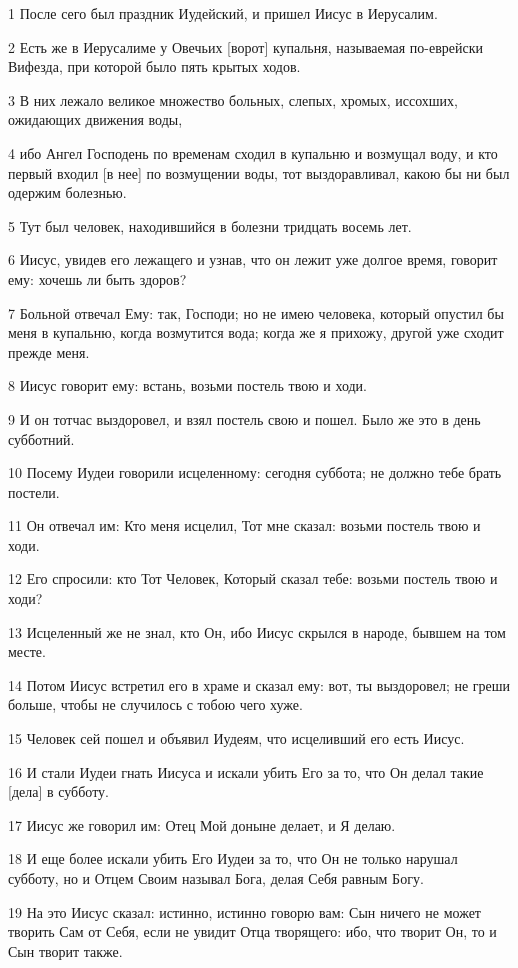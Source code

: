 \par 1 После сего был праздник Иудейский, и пришел Иисус в Иерусалим.
\par 2 Есть же в Иерусалиме у Овечьих [ворот] купальня, называемая по-еврейски Вифезда, при которой было пять крытых ходов.
\par 3 В них лежало великое множество больных, слепых, хромых, иссохших, ожидающих движения воды,
\par 4 ибо Ангел Господень по временам сходил в купальню и возмущал воду, и кто первый входил [в нее] по возмущении воды, тот выздоравливал, какою бы ни был одержим болезнью.
\par 5 Тут был человек, находившийся в болезни тридцать восемь лет.
\par 6 Иисус, увидев его лежащего и узнав, что он лежит уже долгое время, говорит ему: хочешь ли быть здоров?
\par 7 Больной отвечал Ему: так, Господи; но не имею человека, который опустил бы меня в купальню, когда возмутится вода; когда же я прихожу, другой уже сходит прежде меня.
\par 8 Иисус говорит ему: встань, возьми постель твою и ходи.
\par 9 И он тотчас выздоровел, и взял постель свою и пошел. Было же это в день субботний.
\par 10 Посему Иудеи говорили исцеленному: сегодня суббота; не должно тебе брать постели.
\par 11 Он отвечал им: Кто меня исцелил, Тот мне сказал: возьми постель твою и ходи.
\par 12 Его спросили: кто Тот Человек, Который сказал тебе: возьми постель твою и ходи?
\par 13 Исцеленный же не знал, кто Он, ибо Иисус скрылся в народе, бывшем на том месте.
\par 14 Потом Иисус встретил его в храме и сказал ему: вот, ты выздоровел; не греши больше, чтобы не случилось с тобою чего хуже.
\par 15 Человек сей пошел и объявил Иудеям, что исцеливший его есть Иисус.
\par 16 И стали Иудеи гнать Иисуса и искали убить Его за то, что Он делал такие [дела] в субботу.
\par 17 Иисус же говорил им: Отец Мой доныне делает, и Я делаю.
\par 18 И еще более искали убить Его Иудеи за то, что Он не только нарушал субботу, но и Отцем Своим называл Бога, делая Себя равным Богу.
\par 19 На это Иисус сказал: истинно, истинно говорю вам: Сын ничего не может творить Сам от Себя, если не увидит Отца творящего: ибо, что творит Он, то и Сын творит также.
